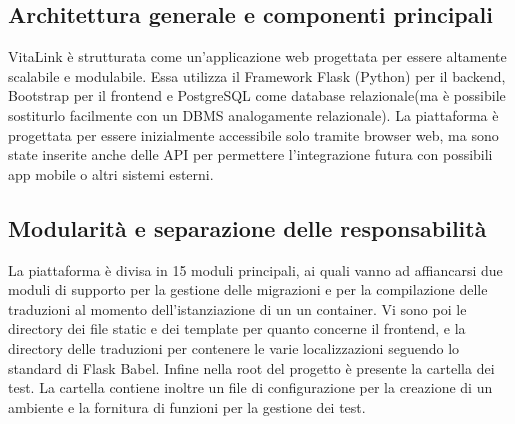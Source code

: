 \documentclass[12pt,a4paper,oneside]{report}
\begin{document}
\subsection{Architettura generale e componenti principali}
VitaLink è strutturata come un'applicazione web progettata per essere altamente scalabile e modulabile. Essa utilizza il Framework Flask (Python) per il backend, Bootstrap per il frontend e PostgreSQL come database relazionale(ma è possibile sostiturlo facilmente con un DBMS analogamente relazionale).
La piattaforma è progettata per essere inizialmente accessibile solo tramite browser web, ma sono state inserite anche delle API per permettere l'integrazione futura con possibili app mobile o altri sistemi esterni.
\subsection{Modularità e separazione delle responsabilità}
La piattaforma è divisa in 15 moduli principali, ai quali vanno ad affiancarsi due moduli di supporto per la gestione delle migrazioni e per la compilazione delle traduzioni al momento dell'istanziazione di un un container.
Vi sono poi le directory dei file static e dei template per quanto concerne il frontend, e la directory delle traduzioni per contenere le varie localizzazioni seguendo lo standard di Flask Babel.
Infine nella root del progetto è presente la cartella dei test. La cartella contiene inoltre un file di configurazione per la creazione di un ambiente e la fornitura di funzioni per la gestione dei test.
\end{document}
